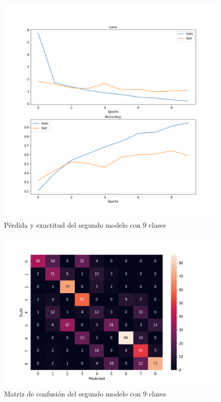 \begin{figure}[H]
	\centering
	\includegraphics[scale=0.65]{figures/LA1.png}
	\caption{Pérdida y exactitud del segundo modelo con 9 clases}
	\label{fig:img11}
\end{figure}

\begin{figure}[H]
	\centering
	\includegraphics[scale=0.75]{figures/CM1.png}
	\caption{Matriz de confusión del segundo modelo con 9 clases}
	\label{fig:img12}
\end{figure}

